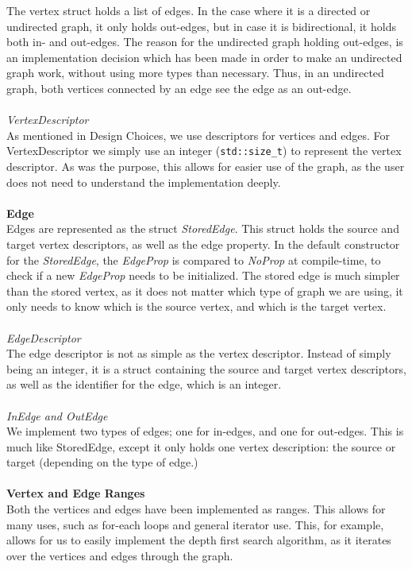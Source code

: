 \documentclass{article}
\begin{document}
The vertex struct holds a list of edges. In the case where it is a directed or undirected graph, it only holds out-edges, but in case it is bidirectional, it holds both in- and out-edges.
The reason for the undirected graph holding out-edges, is an implementation decision which has been made in order to make an undirected graph work, without using more types than necessary. 
Thus, in an undirected graph, both vertices connected by an edge see the edge as an out-edge.
\\\\
\textit{VertexDescriptor}\\
As mentioned in Design Choices, we use descriptors for vertices and edges. For VertexDescriptor we simply use an integer (\texttt{std::size\_t}) to represent the vertex descriptor. As was the purpose, this allows for easier use of the graph, as the user does not need to understand the implementation deeply.
\\\\
\noindent
\textbf{Edge}\\
Edges are represented as the struct \textit{StoredEdge}. This struct holds the source and target vertex descriptors, as well as the edge property. 
In the default constructor for the \textit{StoredEdge}, the \textit{EdgeProp} is compared to \textit{NoProp} at compile-time, to check if a new \textit{EdgeProp} needs to be initialized.
The stored edge is much simpler than the stored vertex, as it does not matter which type of graph we are using, it only needs to know which is the source vertex, and which is the target vertex.
\\\\
\textit{EdgeDescriptor}\\
The edge descriptor is not as simple as the vertex descriptor. Instead of simply being an integer, it is a struct containing the source and target vertex descriptors, as well as the identifier for the edge, which is an integer.
\\\\
\textit{InEdge and OutEdge}\\
We implement two types of edges; one for in-edges, and one for out-edges. This is much like StoredEdge, except it only holds one vertex description: the source or target (depending on the type of edge.)
\\\\
\noindent
\textbf{Vertex and Edge Ranges}\\
Both the vertices and edges have been implemented as ranges. This allows for many uses, such as for-each loops and general iterator use. This, for example, allows for us to easily implement the depth first search algorithm, as it iterates over the vertices and edges through the graph.
\end{document}
